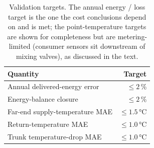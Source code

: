 \begin{table}[t]
\centering
\caption{Validation targets. The annual energy / loss target is the one the cost conclusions
depend on and is met; the point-temperature targets are shown for completeness but are
metering-limited (consumer sensors sit downstream of mixing valves), as discussed in the text.}
\label{tab:valtargets}
\begin{tabular}{lr}
\hline
Quantity & Target \\
\hline
Annual delivered-energy error & $\le 2$\,\% \\
Energy-balance closure & $\le 2$\,\% \\
Far-end supply-temperature MAE & $\le 1.5$\,°C \\
Return-temperature MAE & $\le 1.0$\,°C \\
Trunk temperature-drop MAE & $\le 1.0$\,°C \\
\hline
\end{tabular}
\end{table}
